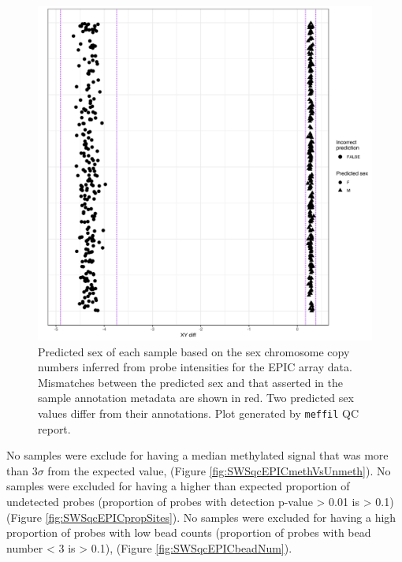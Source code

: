 \documentclass[
]{book}
\begin{document}
\begin{figure}

{\centering \includegraphics[width=0.8\linewidth]{figs/SWSqcEPICsexMismatch} 

}

\caption{Predicted sex of each sample based on the sex chromosome copy numbers inferred from probe intensities for the EPIC array data. Mismatches between the predicted sex and that asserted in the sample annotation metadata are shown in red. Two predicted sex values differ from their annotations. Plot generated by \texttt{meffil} QC report.}\label{fig:SWSqcEPICsexMismatch}
\end{figure}



No samples were exclude for having a median methylated signal that was more than \(3\sigma\) from the expected value, (Figure \ref{fig:SWSqcEPICmethVsUnmeth}).
No samples were excluded for having a higher than expected proportion of undetected probes (proportion of probes with detection p-value \textgreater{} 0.01 is \textgreater{} 0.1) (Figure \ref{fig:SWSqcEPICpropSites}).
No samples were excluded for having a high proportion of probes with low bead counts (proportion of probes with bead number \textless{} 3 is \textgreater{} 0.1), (Figure \ref{fig:SWSqcEPICbeadNum}).
\end{document}
